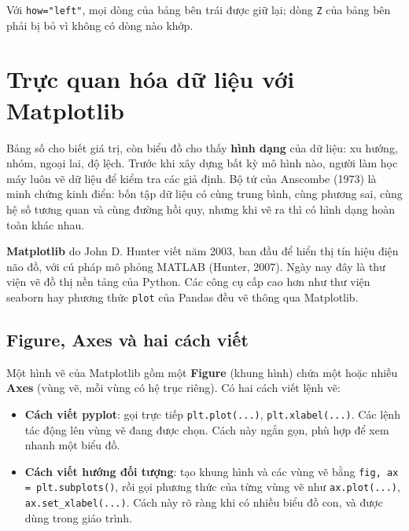 \noindent Với \texttt{how="left"}, mọi dòng của bảng bên trái được giữ lại; dòng \texttt{Z} của bảng bên phải bị bỏ vì không có dòng nào khớp.

\section{Trực quan hóa dữ liệu với Matplotlib}
\label{sec:matplotlib}

Bảng số cho biết giá trị, còn biểu đồ cho thấy \textbf{hình dạng} của dữ liệu: xu hướng, nhóm, ngoại lai, độ lệch. Trước khi xây dựng bất kỳ mô hình nào, người làm học máy luôn vẽ dữ liệu để kiểm tra các giả định. Bộ tứ của Anscombe (1973) là minh chứng kinh điển: bốn tập dữ liệu có cùng trung bình, cùng phương sai, cùng hệ số tương quan và cùng đường hồi quy, nhưng khi vẽ ra thì có hình dạng hoàn toàn khác nhau.

\textbf{Matplotlib} do John D. Hunter viết năm 2003, ban đầu để hiển thị tín hiệu điện não đồ, với cú pháp mô phỏng MATLAB (Hunter, 2007). Ngày nay đây là thư viện vẽ đồ thị nền tảng của Python. Các công cụ cấp cao hơn như thư viện seaborn hay phương thức \texttt{plot} của Pandas đều vẽ thông qua Matplotlib.

\subsection{Figure, Axes và hai cách viết}

Một hình vẽ của Matplotlib gồm một \textbf{Figure} (khung hình) chứa một hoặc nhiều \textbf{Axes} (vùng vẽ, mỗi vùng có hệ trục riêng). Có hai cách viết lệnh vẽ:
\begin{itemize}
    \item \textbf{Cách viết pyplot}: gọi trực tiếp \texttt{plt.plot(...)}, \texttt{plt.xlabel(...)}. Các lệnh tác động lên vùng vẽ đang được chọn. Cách này ngắn gọn, phù hợp để xem nhanh một biểu đồ.
    \item \textbf{Cách viết hướng đối tượng}: tạo khung hình và các vùng vẽ bằng \texttt{fig, ax = plt.subplots()}, rồi gọi phương thức của từng vùng vẽ như \texttt{ax.plot(...)}, \texttt{ax.set\_xlabel(...)}. Cách này rõ ràng khi có nhiều biểu đồ con, và được dùng trong giáo trình.
\end{itemize}

